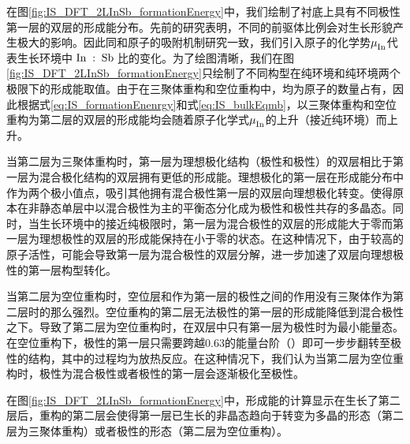 在图\ref{fig:IS_DFT_2LInSb_formationEnergy}中，我们绘制了衬底上具有不同极性第一层的双层的形成能分布。先前的研究表明，不同的前驱体比例会对生长形貌产生极大的影响。因此同和原子的吸附机制研究一致，我们引入原子的化学势$\it \mu_{\rm In}^{\rm } \it$代表生长环境中$\cemb{In}:\cemb{Sb}$比的变化。为了绘图清晰，我们在图\ref{fig:IS_DFT_2LInSb_formationEnergy}只绘制了不同构型在纯环境和纯环境两个极限下的形成能取值。由于在三聚体重构和空位重构中，均为原子的数量占有，因此根据式\ref{eq:IS_formationEnenrgy}和式\ref{eq:IS_bulkEqmb}，以三聚体重构和空位重构为第二层的双层的形成能均会随着原子化学式$\it \mu_{\rm In}^{\rm } \it$的上升（接近纯环境）而上升。


当第二层为三聚体重构时，第一层为理想极化结构（极性和极性）的双层相比于第一层为混合极化结构的双层拥有更低的形成能。理想极化的第一层在形成能分布中作为两个极小值点，吸引其他拥有混合极性第一层的双层向理想极化转变。使得原本在非静态单层中以混合极性为主的平衡态分化成为极性和极性共存的多晶态。同时，当生长环境中的接近纯极限时，第一层为混合极性的双层的形成能大于零而第一层为理想极性的双层的形成能保持在小于零的状态。在这种情况下，由于较高的原子活性，可能会导致第一层为混合极性的双层分解，进一步加速了双层向理想极性的第一层构型转化。

当第二层为空位重构时，空位层和作为第一层的极性之间的作用没有三聚体作为第二层时的那么强烈。空位重构的第二层无法极性的第一层的形成能降低到混合极性之下。导致了第二层为空位重构时，在双层中只有第一层为极性时为最小能量态。在空位重构下，极性的第一层只需要跨越\SI{0.63}{\mievpas}的能量台阶（）即可一步步翻转至极性的结构，其中的过程均为放热反应。在这种情况下，我们认为当第二层为空位重构时，极性为混合极性或者极性的第一层会逐渐极化至极性。

在图\ref{fig:IS_DFT_2LInSb_formationEnergy}中，形成能的计算显示在生长了第二层后，重构的第二层会使得第一层已生长的非晶态趋向于转变为多晶的形态（第二层为三聚体重构）或者极性的形态（第二层为空位重构）。

